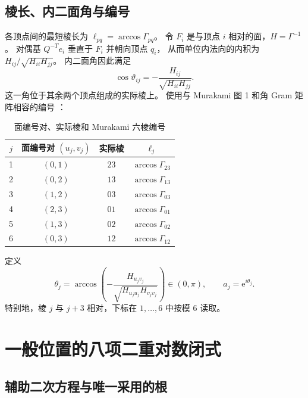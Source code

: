 \documentclass[UTF8,11pt,fontset=none]{ctexart}
\numberwithin{equation}{section}
\theoremstyle{definition}
\newcommand{\ee}{\mathrm e}
\begin{document}
\subsection{棱长、内二面角与编号}

各顶点间的最短棱长为 $\ell_{pq}=\arccos\Gamma_{pq}$。
令 $F_i$ 是与顶点 $i$ 相对的面，$H=\Gamma^{-1}$。
对偶基 $Q^{-T}e_i$ 垂直于 $F_i$ 并朝向顶点 $q_i$，
从而单位内法向的内积为 $H_{ij}/\sqrt{H_{ii}H_{jj}}$。
内二面角因此满足
\begin{equation}
 \cos\vartheta_{ij}
 =-\frac{H_{ij}}{\sqrt{H_{ii}H_{jj}}}.
 \label{eq:dihedral-inverse}
\end{equation}
这一角位于其余两个顶点组成的实际棱上。
使用与 Murakami 图 1 和角 Gram 矩阵相容的编号 \cite{murakami}：

\begin{table}[htbp]
\centering
\caption{面编号对、实际棱和 Murakami 六棱编号}
\begin{tabular}{@{}cccc@{}}
\toprule
$j$ & 面编号对 $(u_j,v_j)$ & 实际棱 & $\ell_j$\\
\midrule
1 & $(0,1)$ & $23$ & $\arccos\Gamma_{23}$\\
2 & $(0,2)$ & $13$ & $\arccos\Gamma_{13}$\\
3 & $(1,2)$ & $03$ & $\arccos\Gamma_{03}$\\
4 & $(2,3)$ & $01$ & $\arccos\Gamma_{01}$\\
5 & $(1,3)$ & $02$ & $\arccos\Gamma_{02}$\\
6 & $(0,3)$ & $12$ & $\arccos\Gamma_{12}$\\
\bottomrule
\end{tabular}
\end{table}

定义
\begin{equation}
 \theta_j=\arccos\left(-\frac{H_{u_jv_j}}
 {\sqrt{H_{u_ju_j}H_{v_jv_j}}}\right)\in(0,\pi),
 \qquad a_j=\ee^{i\theta_j}.
 \label{eq:angles}
\end{equation}
特别地，棱 $j$ 与 $j+3$ 相对，下标在 $1,\ldots,6$ 中按模 $6$ 读取。

\section{一般位置的八项二重对数闭式}\label{sec:dilog}

\subsection{辅助二次方程与唯一采用的根}
\end{document}
